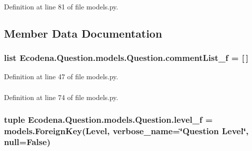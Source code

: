 Definition at line 81 of file models.py.



\subsection{Member Data Documentation}
\hypertarget{class_ecodena_1_1_question_1_1models_1_1_question_ae202257a6a3b5630cd345936d8e258c3}{
\subsubsection[{commentList\_\-f}]{\setlength{\rightskip}{0pt plus 5cm}list {\bf Ecodena.Question.models.Question.commentList\_\-f} = \mbox{[}$\,$\mbox{]}}}
\label{d1/d67/class_ecodena_1_1_question_1_1models_1_1_question_ae202257a6a3b5630cd345936d8e258c3}


Definition at line 47 of file models.py.

\hypertarget{class_ecodena_1_1_question_1_1models_1_1_question_a4bd58a5bfd741f2442344987976725b2}{
\subsubsection[{commentList\_\-f}]{}}
\label{d1/d67/class_ecodena_1_1_question_1_1models_1_1_question_a4bd58a5bfd741f2442344987976725b2}


Definition at line 74 of file models.py.

\hypertarget{class_ecodena_1_1_question_1_1models_1_1_question_a6dfb4e057e2757e3ea7387fa9aa6b741}{
\subsubsection[{level\_\-f}]{\setlength{\rightskip}{0pt plus 5cm}tuple {\bf Ecodena.Question.models.Question.level\_\-f} = models.ForeignKey({\bf Level}, verbose\_\-name=\char`\"{}Question {\bf Level}\char`\"{}, null=False)}}
\label{d1/d67/class_ecodena_1_1_question_1_1models_1_1_question_a6dfb4e057e2757e3ea7387fa9aa6b741}



